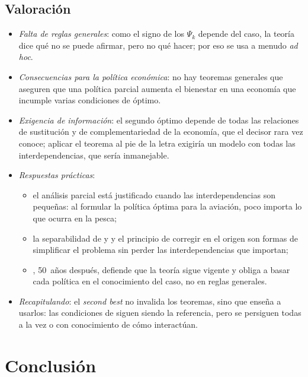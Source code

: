 \documentclass[11pt]{article}
\begin{document}
\subsection{Valoración}\label{sec:second-best-valoracion}

\begin{itemize}
\item \emph{Falta de reglas generales}: como el signo de los $\Psi_k$ depende del caso, la teoría dice qué no se puede afirmar, pero no qué hacer; por eso se usa a menudo \emph{ad hoc}.
\item \emph{Consecuencias para la política económica}: no hay teoremas generales que aseguren que una política parcial aumenta el bienestar en una economía que incumple varias condiciones de óptimo.
\item \emph{Exigencia de información}: el segundo óptimo depende de todas las relaciones de sustitución y de complementariedad de la economía, que el decisor rara vez conoce; aplicar el teorema al pie de la letra exigiría un modelo con todas las interdependencias, que sería inmanejable.
\item \emph{Respuestas prácticas}:
  \begin{itemize}
  \item el análisis parcial está justificado cuando las interdependencias son pequeñas: al formular la política óptima para la aviación, poco importa lo que ocurra en la pesca;
  \item la separabilidad de  y  y el principio de corregir en el origen son formas de simplificar el problema sin perder las interdependencias que importan;
  \item \textcite{Lipsey2007Reflections}, 50~años después, defiende que la teoría sigue vigente y obliga a basar cada política en el conocimiento del caso, no en reglas generales.
  \end{itemize}
\item \emph{Recapitulando}: el \emph{second best} no invalida los teoremas, sino que enseña a usarlos: las condiciones de  siguen siendo la referencia, pero se persiguen todas a la vez o con conocimiento de cómo interactúan.
\end{itemize}


\section*{Conclusión}
\end{document}
